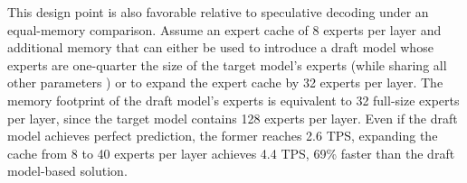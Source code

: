 This design point is also favorable relative to speculative decoding under an equal-memory comparison. Assume an expert cache of 8 experts per layer and additional memory that can either be used to introduce a draft model whose experts are one-quarter the size of the target model's experts (while sharing all other parameters \cite{wang2025moespeqspeculativequantizeddecoding}) or to expand the expert cache by 32 experts per layer. The memory footprint of the draft model's experts is equivalent to 32 full-size experts per layer, since the target model contains 128 experts per layer. Even if the draft model achieves perfect prediction, the former reaches 2.6 TPS, expanding the cache from 8 to 40 experts per layer achieves 4.4 TPS, 69\% faster than the draft model-based solution.



